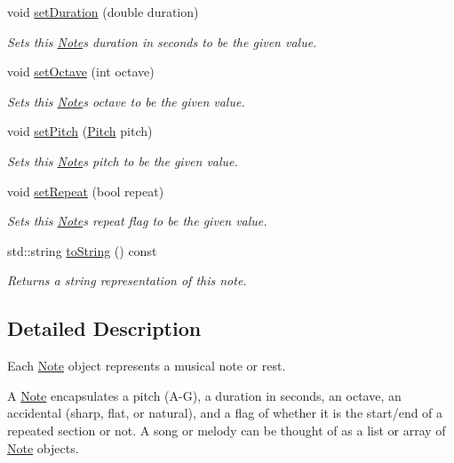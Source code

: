 \begin{DoxyCompactItemize}
void \mbox{\hyperlink{classNote_ae526af16e9c7c5cb703ece0cc6c88031}{set\+Duration}} (double duration)
\begin{DoxyCompactList}\small\item\em Sets this \mbox{\hyperlink{classNote}{Note}}\textquotesingle{}s duration in seconds to be the given value. \end{DoxyCompactList}\item 
void \mbox{\hyperlink{classNote_ac4034a6b7e43254466284d573d9e4186}{set\+Octave}} (int octave)
\begin{DoxyCompactList}\small\item\em Sets this \mbox{\hyperlink{classNote}{Note}}\textquotesingle{}s octave to be the given value. \end{DoxyCompactList}\item 
void \mbox{\hyperlink{classNote_afc6ff460b36c61aead47c60340789d00}{set\+Pitch}} (\mbox{\hyperlink{classNote_a6753778520a0d8493f6c18f6e6818542}{Pitch}} pitch)
\begin{DoxyCompactList}\small\item\em Sets this \mbox{\hyperlink{classNote}{Note}}\textquotesingle{}s pitch to be the given value. \end{DoxyCompactList}\item 
void \mbox{\hyperlink{classNote_acbc8ea9a0222ced8202d9c739f9b5054}{set\+Repeat}} (bool repeat)
\begin{DoxyCompactList}\small\item\em Sets this \mbox{\hyperlink{classNote}{Note}}\textquotesingle{}s repeat flag to be the given value. \end{DoxyCompactList}\item 
std\+::string \mbox{\hyperlink{classNote_a1fe5121d6528fdea3f243321b3fa3a49}{to\+String}} () const
\begin{DoxyCompactList}\small\item\em Returns a string representation of this note. \end{DoxyCompactList}\end{DoxyCompactItemize}


\subsection{Detailed Description}
Each \mbox{\hyperlink{classNote}{Note}} object represents a musical note or rest. 

A \mbox{\hyperlink{classNote}{Note}} encapsulates a pitch (A-\/G), a duration in seconds, an octave, an accidental (sharp, flat, or natural), and a flag of whether it is the start/end of a repeated section or not. A song or melody can be thought of as a list or array of \mbox{\hyperlink{classNote}{Note}} objects. 

